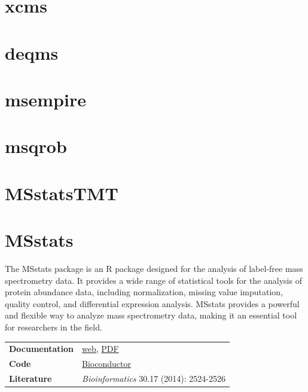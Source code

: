 \documentclass[
]{book}
\begin{document}
\hypertarget{xcms}{%
\section{xcms}\label{xcms}}

\hypertarget{deqms}{%
\section{deqms}\label{deqms}}

\hypertarget{msempire}{%
\section{msempire}\label{msempire}}

\hypertarget{msqrob}{%
\section{msqrob}\label{msqrob}}

\hypertarget{msstatstmt}{%
\section{MSstatsTMT}\label{msstatstmt}}

\hypertarget{msstats}{%
\section{MSstats}\label{msstats}}

The MSstats package is an R package designed for the analysis of label-free mass spectrometry data. It provides a wide range of statistical tools for the analysis of protein abundance data, including normalization, missing value imputation, quality control, and differential expression analysis. MSstats provides a powerful and flexible way to analyze mass spectrometry data, making it an essential tool for researchers in the field.

\begin{longtable}[]{@{}
  >{\raggedright\arraybackslash}p{}
  >{\raggedright\arraybackslash}p{}@{}}
\toprule\noalign{}
\endhead
\bottomrule\noalign{}
\endlastfoot
\textbf{Documentation} & \href{https://msstats.org}{web}, \href{https://bioconductor.org/packages/release/bioc/manuals/MSstats/man/MSstats.pdf}{PDF} \\
\textbf{Code} & \href{https://www.bioconductor.org/packages/release/bioc/html/MSstats.html}{Bioconductor} \\
\textbf{Literature} & \emph{Bioinformatics} 30.17 (2014): 2524-2526 \\
\end{longtable}
\end{document}
